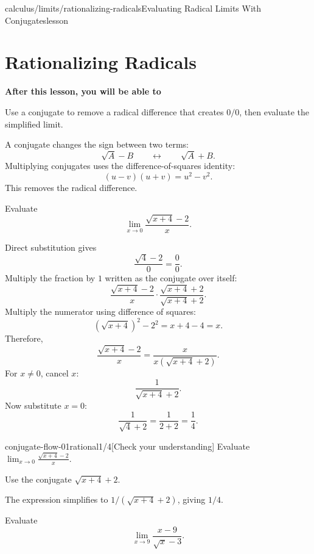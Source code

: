 \documentclass[11pt,openany]{book}
\theoremstyle{bgplain}
\newcounter{bgexample}[chapter]
\newcounter{bgcheck}[section]
\newcommand{\lessonobjective}[1]{%
  \par\Needspace{4\baselineskip}\addvspace{0.6em}%
  {\bfseries\color{BGInk}After this lesson, you will be able to}\par\smallskip
  #1\par\addvspace{0.5em}%
}
\begin{document}
\begin{webpage}{calculus/limits/rationalizing-radicals}{Evaluating Radical Limits With Conjugates}{lesson}
\section{Rationalizing Radicals}

\lessonobjective{
Use a conjugate to remove a radical difference that creates \(0/0\), then evaluate the simplified limit.
}

A conjugate changes the sign between two terms:
\[
  \sqrt{A}-B
  \qquad\longleftrightarrow\qquad
  \sqrt{A}+B.
\]
Multiplying conjugates uses the difference-of-squares identity:
\[
  (u-v)(u+v)=u^2-v^2.
\]
This removes the radical difference.

\begin{bgguided}[title={One conjugate, every line shown}]
Evaluate
\[
  \lim_{x\to0}\frac{\sqrt{x+4}-2}{x}.
\]

\begin{bgsolution}
Direct substitution gives
\[
  \frac{\sqrt4-2}{0}=\frac00.
\]
Multiply the fraction by \(1\) written as the conjugate over itself:
\[
\frac{\sqrt{x+4}-2}{x}
\cdot
\frac{\sqrt{x+4}+2}{\sqrt{x+4}+2}.
\]
Multiply the numerator using difference of squares:
\[
  (\sqrt{x+4})^2-2^2=x+4-4=x.
\]
Therefore,
\[
\frac{\sqrt{x+4}-2}{x}
=\frac{x}{x(\sqrt{x+4}+2)}.
\]
For \(x\ne0\), cancel \(x\):
\[
  \frac{1}{\sqrt{x+4}+2}.
\]
Now substitute \(x=0\):
\[
  \frac1{\sqrt4+2}=\frac1{2+2}=\boxed{\frac14}.
\]
\end{bgsolution}
\end{bgguided}


\begin{bgcheck}{conjugate-flow-01}{rational}{1/4}[Check your understanding]
Evaluate \(\lim_{x\to0}\frac{\sqrt{x+4}-2}{x}\).
\begin{bghint}
Use the conjugate \(\sqrt{x+4}+2\).
\end{bghint}
\begin{bgreveal}
The expression simplifies to \(1/(\sqrt{x+4}+2)\), giving \(1/4\).
\end{bgreveal}
\end{bgcheck}



\begin{bgexample}[title={Radical in the denominator}]
Evaluate
\[
  \lim_{x\to9}\frac{x-9}{\sqrt{x}-3}.
\]


\end{bgexample}
\end{webpage}
\end{document}
